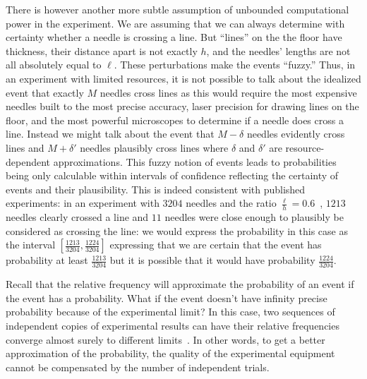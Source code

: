 \documentclass{article}
\theoremstyle{remark}
\begin{document}
There is however another more subtle assumption of unbounded computational
power in the experiment. We are assuming that we can always determine
with certainty whether a needle is crossing a line. But ``lines''
on the the floor have thickness, their distance apart is not exactly
$h$, and the needles' lengths are not all absolutely equal to $\ell$.
These perturbations make the events ``fuzzy.'' Thus, in an experiment
with limited resources, it is not possible to talk about the idealized
event that exactly $M$ needles cross lines as this would require
the most expensive needles built to the most precise accuracy, laser
precision for drawing lines on the floor, and the most powerful microscopes
to determine if a needle does cross a line. Instead we might talk
about the event that $M-\delta$ needles evidently cross lines and
$M+\delta'$ needles plausibly cross lines where $\delta$ and $\delta'$
are resource-dependent approximations. This fuzzy notion of events
leads to probabilities being only calculable within intervals of confidence
reflecting the certainty of events and their plausibility. This is
indeed consistent with published experiments: in an experiment with
$3204$ needles and the ratio $\frac{\ell}{h}=0.6$~\cite{DeMorgan1872},
$1213$ needles clearly crossed a line and $11$ needles were close
enough to plausibly be considered as crossing the line: we would express
the probability in this case as the interval $\left[\frac{1213}{3204},\frac{1224}{3204}\right]$
expressing that we are certain that the event has probability at least
$\frac{1213}{3204}$ but it is possible that it would have probability
$\frac{1224}{3204}$.

Recall that the relative frequency will approximate the probability
of an event if the event has a probability. What if the event doesn't
have infinity precise probability because of the experimental limit?
In this case, two sequences of independent copies of experimental
results can have their relative frequencies converge almost surely
to different limits~\cite{Marinacci1999,Teran2014}. In other words,
to get a better approximation of the probability, the quality of the
experimental equipment cannot be compensated by the number of independent
trials.

 
\end{document}

